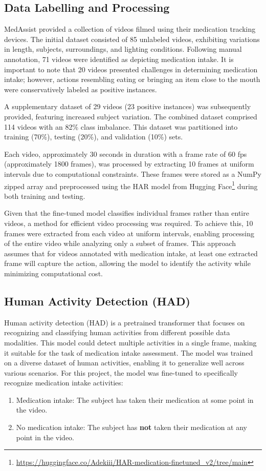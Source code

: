 \documentclass[a4paper,12pt]{article}
\begin{document}
\subsection{Data Labelling and Processing}

MedAssist provided a collection of videos filmed using their medication tracking devices. The initial dataset consisted of 85 unlabeled videos, exhibiting variations in length, subjects, surroundings, and lighting conditions. Following manual annotation, 71 videos were identified as depicting medication intake. It is important to note that 20 videos presented challenges in determining medication intake; however, actions resembling eating or bringing an item close to the mouth were conservatively labeled as positive instances.

A supplementary dataset of 29 videos (23 positive instances) was subsequently provided, featuring increased subject variation. The combined dataset comprised 114 videos with an 82\% class imbalance. This dataset was partitioned into training (70\%), testing (20\%), and validation (10\%) sets.

Each video, approximately 30 seconds in duration with a frame rate of 60 fps (approximately 1800 frames), was processed by extracting 10 frames at uniform intervals due to computational constraints. These frames were stored as a NumPy zipped array and preprocessed using the HAR model from Hugging Face\footnote{\url{https://huggingface.co/Adekiii/HAR-medication-finetuned_v2/tree/main}} during both training and testing.

Given that the fine-tuned model classifies individual frames rather than entire
videos, a method for efficient video processing was required. To achieve this, 10
frames were extracted from each video at uniform intervals, enabling processing of
the entire video while analyzing only a subset of frames. This approach assumes
that for videos annotated with medication intake, at least one extracted frame
will capture the action, allowing the model to identify the activity while minimizing
computational cost.

\subsection{Human Activity Detection (HAD)}
Human activity detection (HAD) is a pretrained transformer that focuses on recognizing
and classifying human activities from different possible data modalities. This model could detect multiple activities in a single frame, making it suitable for the task of medication intake assessment. The model was trained on a diverse dataset of human activities, enabling it to generalize well across various scenarios. For this project, the model was fine-tuned to specifically recognize medication intake activities: 
\renewcommand{\labelenumi}{\Roman{enumi}.}
\begin{enumerate}
    \item Medication intake: The subject has taken their medication at some point in the video.
    \item No medication intake: The subject has \textbf{not} taken their medication at any point in the video.
\end{enumerate}
\end{document}
